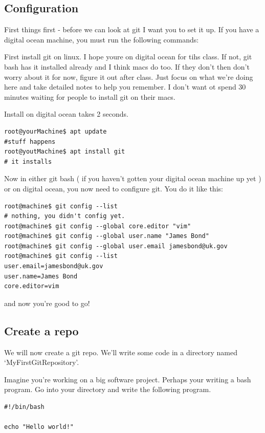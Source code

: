 \documentclass[10pt]{article}
\begin{document}
\subsection{Configuration}
First things first - before we can look at git I want you to set it up. If you
have a digital ocean machine, you must run the following commands:

First install git on linux. I hope youre on digital ocean for tihs class. If
not, git bash has it installed already and I think macs
do too. If they don't then don't worry about it for now, figure it out after
class. Just focus on what we're doing here and take detailed notes to help you
remember. I don't want ot spend 30 minutes waiting for people to install git on
their macs.

Install on digital ocean takes 2 seconds.
\begin{lstlisting}[style=term]
root@yourMachine$ apt update
#stuff happens
root@youtMachine$ apt install git
# it installs
\end{lstlisting}

Now in either git bash ( if you haven't gotten your digital ocean machine up yet
) or on digital ocean, you now need to configure git. You do it like this:

\begin{lstlisting}[style=term]
root@machine$ git config --list
# nothing, you didn't config yet.
root@machine$ git config --global core.editor "vim"
root@machine$ git config --global user.name "James Bond"
root@machine$ git config --global user.email jamesbond@uk.gov
root@machine$ git config --list
user.email=jamesbond@uk.gov
user.name=James Bond
core.editor=vim
\end{lstlisting}

and now you're good to go!

\subsection{Create a repo}
We will now create a git repo. We'll write some code in a directory named
`MyFirstGitRepository'.

Imagine you're working on a big software project. Perhaps your writing a bash
program. Go into your directory and write the following program.

\begin{lstlisting}[style=sh]
#!/bin/bash

echo "Hello world!"
\end{lstlisting}
\end{document}
